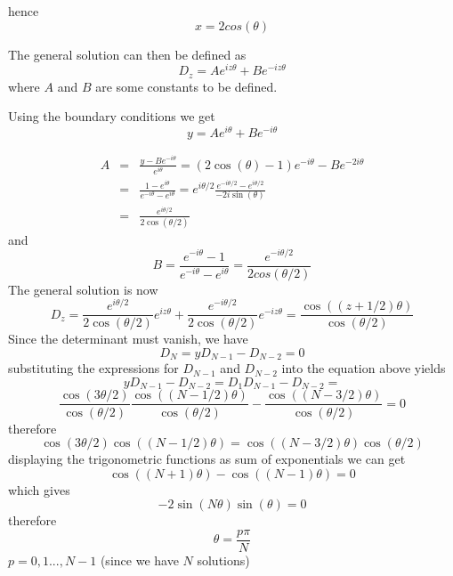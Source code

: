 \documentclass{report}
\begin{document}
hence
\begin{equation*}
x=2cos(\theta)
\end{equation*}

The general solution can then be defined as 
\begin{equation*}
D_z=Ae^{iz\theta}+Be^{-iz\theta}
\end{equation*}
where $A$ and $B$ are some constants to be defined.

 Using the boundary conditions we get 
 \begin{equation*}
 y = Ae^{i\theta}+Be^{-i\theta}
 \end{equation*}
 
 \begin{eqnarray*}
 A & = & \frac{y-Be^{-i\theta}}{e^{i\theta}} = (2\cos(\theta)-1)e^{-i\theta}-Be^{-2i\theta}\\
   & = & \frac{1-e^{i\theta}}{e^{-i\theta}-e^{i\theta}} = e^{i\theta/2}\frac{e^{-i\theta/2}-e^{i\theta/2}}{-2i\sin(\theta)}\\
   & = & \frac{e^{i\theta/2}}{2\cos(\theta/2)}
 \end{eqnarray*}
 and 
 \begin{equation*}
 B=\frac{e^{-i\theta}-1}{e^{-i\theta}-e^{i\theta}}=\frac{e^{-i\theta/2}}{2cos(\theta/2)}
 \end{equation*}
The general solution is now
\begin{equation}
D_z=\frac{e^{i\theta/2}}{2\cos(\theta/2)}e^{iz\theta}+\frac{e^{-i\theta/2}}{2\cos(\theta/2)}e^{-iz\theta}=\frac{\cos((z+1/2)\theta)}{\cos(\theta/2)}
\end{equation}
Since the determinant must vanish, we have 
\begin{equation*}
D_N = yD_{N-1}-D_{N-2}=0
\end{equation*}
substituting the expressions for $D_{N-1}$ and $D_{N-2}$ into the equation above yields 
\begin{equation*}
yD_{N-1}-D_{N-2} = D_1D_{N-1}-D_{N-2} = 
\end{equation*}
\begin{equation*}
\frac{\cos(3\theta/2)}{\cos(\theta/2)}\frac{\cos((N-1/2)\theta)}{\cos(\theta/2)}-\frac{\cos((N-3/2)\theta)}{\cos(\theta/2)}=0
\end{equation*}
therefore 
\begin{equation*}
\cos(3\theta/2)\cos((N-1/2)\theta)=\cos((N-3/2)\theta)\cos(\theta/2)
\end{equation*}
displaying the trigonometric functions as sum of exponentials we can get
\begin{equation*}
\cos((N+1)\theta)-\cos((N-1)\theta)=0
\end{equation*}
which gives 
\begin{equation*}
-2\sin(N\theta)\sin(\theta)=0
\end{equation*}
therefore 
\begin{equation*}
\theta = \frac{p\pi}{N}
\end{equation*}
$p=0,1...,N-1$ (since we have $N$ solutions)\\
\end{document}
